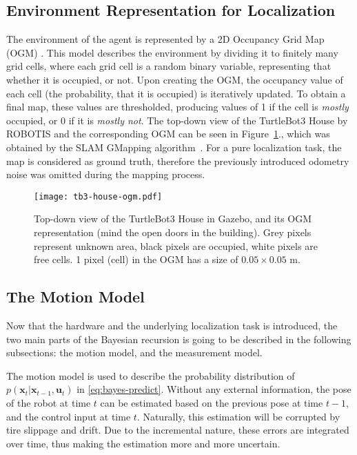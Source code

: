 \subsection{Environment Representation for Localization}\label{subsec:map}
The environment of the agent is represented by a 2D Occupancy Grid Map (OGM) \cite{Moravec1985}.
This model describes the environment by dividing it to finitely many grid cells, where each grid cell is a random binary variable,
representing that whether it is occupied, or not.
Upon creating the OGM, the occupancy value of each cell (the probability, that it is occupied) is iteratively updated.
To obtain a final map, these values are thresholded, producing values of 1 if the cell is \emph{mostly} occupied,
or 0 if it is \emph{mostly not}.
The top-down view of the TurtleBot3 House by ROBOTIS and the corresponding OGM can be seen in Figure~\ref{fig:tb3-house-ogm}.,
which was obtained by the SLAM GMapping algorithm~\cite{Grisetti2007}.
For a pure localization task, the map is considered as ground truth,
therefore the previously introduced odometry noise was omitted during the mapping process.
\begin{figure}[htbp]
    \centering
    \texttt{[image: tb3-house-ogm.pdf]}
    \caption{Top-down view of the TurtleBot3 House in Gazebo, and its OGM representation (mind the open doors in the building).
        Grey pixels represent unknown area, black pixels are occupied, white pixels are free cells.
        1 pixel (cell) in the OGM has a size of $0.05 \times 0.05$ m. }
    \label{fig:tb3-house-ogm}
\end{figure}
\subsection{The Motion Model}\label{subsec:mot-model}
Now that the hardware and the underlying localization task is introduced, the two main parts of the
Bayesian recursion is going to be described in the following subsections: the motion model, and the measurement model.

The motion model is used to describe the probability distribution of
$p(\mathbf{x}_t | \mathbf{x}_{t-1},\mathbf{u}_t)$ in \eqref{eq:bayes-predict}. \linebreak
Without any external information, the pose of the robot at time $t$ can be estimated based on the previous pose
at time $t-1$, and the control input at time $t$. Naturally, this estimation will be corrupted by tire slippage and drift.
Due to the incremental nature, these errors are integrated over time, thus making the estimation more and more
uncertain.


